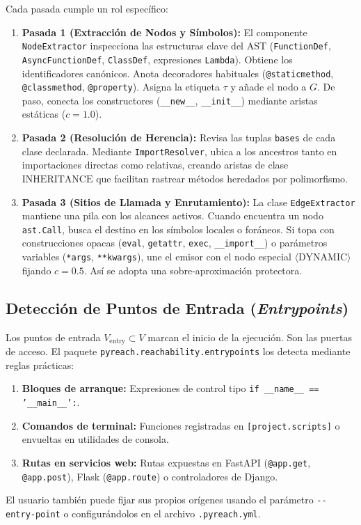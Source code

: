 \documentclass[conference]{IEEEtran}
\newcommand{\clioption}[1]{\texttt{-{}-#1}}
\newcommand{\pydunder}[1]{\texttt{\_\_#1\_\_}}
\begin{document}
Cada pasada cumple un rol específico:
\begin{enumerate}
    \item \textbf{Pasada 1 (Extracción de Nodos y Símbolos):} El componente \texttt{NodeExtractor} inspecciona las estructuras clave del AST (\texttt{FunctionDef}, \texttt{AsyncFunctionDef}, \texttt{ClassDef}, expresiones \texttt{Lambda}). Obtiene los identificadores canónicos. Anota decoradores habituales (\texttt{@staticmethod}, \texttt{@classmethod}, \texttt{@property}). Asigna la etiqueta $\tau$ y añade el nodo a $G$. De paso, conecta los constructores (\pydunder{new}, \pydunder{init}) mediante aristas estáticas ($c=1.0$).
    \item \textbf{Pasada 2 (Resolución de Herencia):} Revisa las tuplas \texttt{bases} de cada clase declarada. Mediante \texttt{ImportResolver}, ubica a los ancestros tanto en importaciones directas como relativas, creando aristas de clase $\text{INHERITANCE}$ que facilitan rastrear métodos heredados por polimorfismo.
    \item \textbf{Pasada 3 (Sitios de Llamada y Enrutamiento):} La clase \texttt{EdgeExtractor} mantiene una pila con los alcances activos. Cuando encuentra un nodo \texttt{ast.Call}, busca el destino en los símbolos locales o foráneos. Si topa con construcciones opacas (\texttt{eval}, \texttt{getattr}, \texttt{exec}, \texttt{\_\_import\_\_}) o parámetros variables (\texttt{*args}, \texttt{**kwargs}), une el emisor con el nodo especial $\langle\text{DYNAMIC}\rangle$ fijando $c=0.5$. Así se adopta una sobre-aproximación protectora.
\end{enumerate}

\subsection{Detección de Puntos de Entrada (\textit{Entrypoints})}
Los puntos de entrada $V_{\text{entry}} \subset V$ marcan el inicio de la ejecución. Son las puertas de acceso. El paquete \texttt{pyreach.reachability.entrypoints} los detecta mediante reglas prácticas:
\begin{enumerate}
    \item \textbf{Bloques de arranque:} Expresiones de control tipo \texttt{if \pydunder{name} == '\pydunder{main}':}.
    \item \textbf{Comandos de terminal:} Funciones registradas en \texttt{[project.scripts]} o envueltas en utilidades de consola.
    \item \textbf{Rutas en servicios web:} Rutas expuestas en FastAPI (\texttt{@app.get}, \texttt{@app.post}), Flask (\texttt{@app.route}) o controladores de Django.
\end{enumerate}
El usuario también puede fijar sus propios orígenes usando el parámetro \clioption{entry-point} o configurándolos en el archivo \texttt{.pyreach.yml}.
\end{document}
